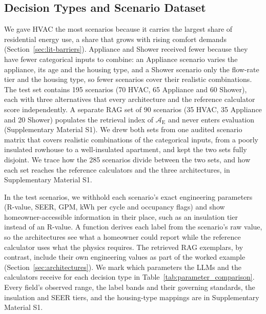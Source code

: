 \documentclass[final,3p,times]{elsarticle}
\begin{document}
\subsection{Decision Types and Scenario Dataset}
\label{sec:dataset}
We gave HVAC the most scenarios because it carries the largest share of residential energy use, a share that grows with rising comfort demands (Section~\ref{sec:lit-barriers}). Appliance and Shower received fewer because they have fewer categorical inputs to combine: an Appliance scenario varies the appliance, its age and the housing type, and a Shower scenario only the flow-rate tier and the housing type, so fewer scenarios cover their realistic combinations. The test set contains 195 scenarios (70 HVAC, 65 Appliance and 60 Shower), each with three alternatives that every architecture and the reference calculator score independently. A separate RAG set of 90 scenarios (35 HVAC, 35 Appliance and 20 Shower) populates the retrieval index of $\mathcal{A}_{\text{E}}$ \cite{lewis2020} and never enters evaluation (Supplementary Material S1). We drew both sets from one audited scenario matrix that covers realistic combinations of the categorical inputs, from a poorly insulated rowhouse to a well-insulated apartment, and kept the two sets fully disjoint. We trace how the 285 scenarios divide between the two sets, and how each set reaches the reference calculators and the three architectures, in Supplementary Material S1.

In the test scenarios, we withhold each scenario's exact engineering parameters (R-value, SEER, GPM, kWh per cycle and occupancy flags) and show homeowner-accessible information in their place, such as an insulation tier instead of an R-value. A function derives each label from the scenario's raw value, so the architectures see what a homeowner could report while the reference calculator uses what the physics requires. The retrieved RAG exemplars, by contrast, include their own engineering values as part of the worked example (Section~\ref{sec:architectures}). We mark which parameters the LLMs and the calculators receive for each decision type in Table~\ref{tab:parameter_comparison}. Every field's observed range, the label bands and their governing standards, the insulation and SEER tiers, and the housing-type mappings are in Supplementary Material S1.
\end{document}
